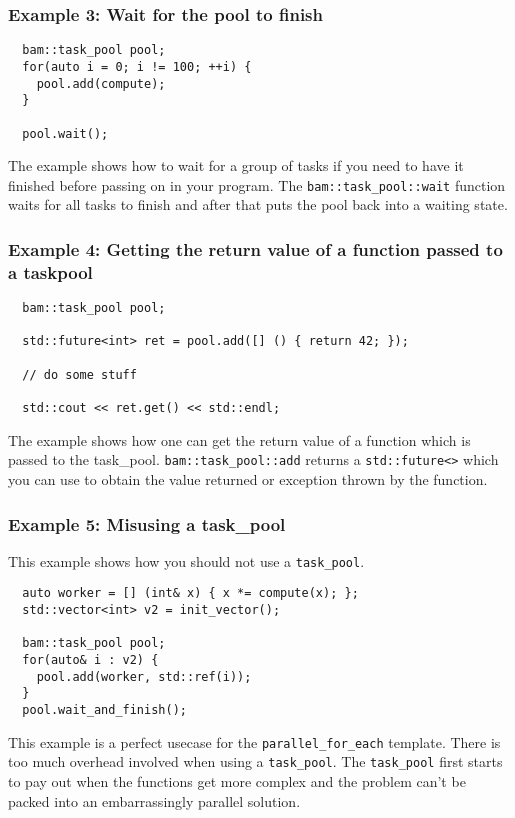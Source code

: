 \documentclass[11pt, a4paper]{article}
\begin{document}
\subsubsection{Example 3: Wait for the pool to finish}
\begin{lstlisting}
  bam::task_pool pool;
  for(auto i = 0; i != 100; ++i) {
    pool.add(compute);
  }

  pool.wait();
\end{lstlisting}
The example shows how to wait for a group of tasks if you need to have it finished before passing on in your program. The \texttt{bam::task\_pool::wait} function waits for all tasks to finish and after that puts the pool back into a waiting state.

\subsubsection{Example 4: Getting the return value of a function passed to a taskpool}
\begin{lstlisting}
  bam::task_pool pool;

  std::future<int> ret = pool.add([] () { return 42; });

  // do some stuff

  std::cout << ret.get() << std::endl;

\end{lstlisting}
The example shows how one can get the return value of a function which is passed to the task\_pool. \texttt{bam::task\_pool::add} returns a \texttt{std::future<>} which you can use to obtain the value returned or exception thrown by the function. 

\subsubsection{Example 5: Misusing a task\_pool}
This example shows how you should not use a \texttt{task\_pool}.

\begin{lstlisting}
  auto worker = [] (int& x) { x *= compute(x); };
  std::vector<int> v2 = init_vector();

  bam::task_pool pool;
  for(auto& i : v2) {
    pool.add(worker, std::ref(i));
  }
  pool.wait_and_finish();
\end{lstlisting}
This example is a perfect usecase for the \texttt{parallel\_for\_each} template. There is too much overhead involved when using a \texttt{task\_pool}. The \texttt{task\_pool} first starts to pay out when the functions get more complex and the problem can't be packed into an embarrassingly parallel solution.
\end{document}
